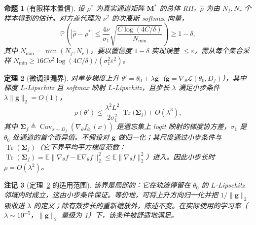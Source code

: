 \documentclass[11pt,a4paper]{article}
\newtheorem{theorem}{定理}[section]
\newtheorem{proposition}[theorem]{命题}
\newtheorem{remark}[theorem]{注记}
\newcommand{\coloneqq}{\triangleq}
\begin{document}
\begin{proposition}[有限样本置信]
\label{prop:confidence}
设 $\rho^*$ 为真实通道矩阵 $\mathbf{M}^*$ 的总体 RII，$\hat{\rho}$ 为由 $N_f, N_r$ 个样本得到的估计。对方差代理为 $\nu^2$ 的次高斯 softmax 向量，
\begin{equation}
\mathbb{P}\!\left(|\hat{\rho} - \rho^*| \le \frac{4\nu}{\sigma_1}\sqrt{\frac{C\log(4C/\delta)}{N_{\min}}}\right) \ge 1-\delta,
\end{equation}
其中 $N_{\min}=\min(N_f,N_r)$。要以置信度 $1-\delta$ 实现误差 $\le\varepsilon$，需从每个集合采样 $N_{\min} \ge 16C\nu^2\log(4C/\delta)/(\sigma_1^2\varepsilon^2)$。
\end{proposition}

\begin{theorem}[微调泄漏界]
\label{thm:finetune}
对单步梯度上升 $\theta' = \theta_0 + \lambda\mathbf{g}$（$\mathbf{g}=\nabla_\theta\mathcal{L}(\theta_0, D_f)$），其中梯度 $L$-Lipschitz 且 softmax 映射 $L$-Lipschitz，且步长 $\lambda$ 满足小步条件 $\lambda\|\mathbf{g}\|_2=O(1)$，
\begin{equation}
\rho(\theta') \le \frac{\lambda^2 L^2}{2\sigma_1^2}\,\operatorname{Tr}\bigl(\boldsymbol{\Sigma}_f\bigr) + O(\lambda^3),
\label{eq:finetune_bound}
\end{equation}
其中 $\boldsymbol{\Sigma}_f \coloneqq \operatorname{Cov}_{x\sim D_f}(\nabla_\theta f_{\theta_0}(x))$ 是遗忘集上 logit 映射的梯度协方差，$\sigma_1$ 是 $\theta_0$ 处通道的首个奇异值。不假设对 $\mathbf{g}$ 做归一化；其尺度通过小步条件与 $\operatorname{Tr}(\boldsymbol{\Sigma}_f)$（它下界平均平方梯度范数：$\operatorname{Tr}(\boldsymbol{\Sigma}_f)=\mathbb{E}\|\nabla_\theta f-\mathbb{E}\nabla_\theta f\|_2^2\le\mathbb{E}\|\nabla_\theta f\|_2^2$）进入。因此小步长时 $\rho = O(\lambda^2)$。
\end{theorem}

\begin{remark}[定理~\ref{thm:finetune} 的适用范围]
该界是局部的：它在轨迹停留在 $\theta_0$ 的 $L$-Lipschitz 邻域内时成立，这由小步条件保证。等价地，可将上升方向归一化并把 $1/\|\mathbf{g}\|_2$ 吸收进 $\lambda$ 的定义；除有效步长的重新缩放外，陈述不变。在实际使用的学习率（$\lambda{\sim}10^{-5}$，$\|\mathbf{g}\|_2$ 量级为 1）下，该条件被舒适地满足。
\end{remark}
\end{document}
